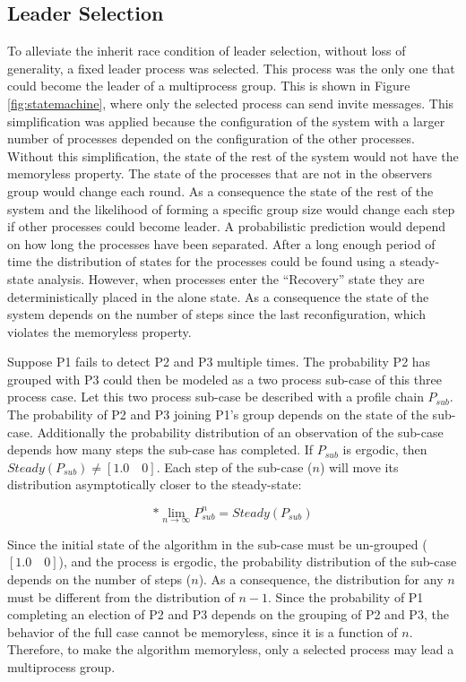 \subsection{Leader Selection}

To alleviate the inherit race condition of leader selection, without loss of generality, a fixed leader process was selected.
This process was the only one that could become the leader of a multiprocess group.
This is shown in Figure \ref{fig:statemachine}, where only the selected process can send invite messages.
This simplification was applied because the configuration of the system with a larger number of processes depended on the configuration of the other processes.
Without this simplification, the state of the rest of the system would not have the memoryless property.
The state of the processes that are not in the observers group would change each round.
As a consequence the state of the rest of the system and the likelihood of forming a specific group size would change each step if other processes could become leader.
A probabilistic prediction would depend on how long the processes have been separated.
After a long enough period of time the distribution of states for the processes could be found using a steady-state analysis.
However, when processes enter the ``Recovery'' state they are deterministically placed in the alone state.
As a consequence the state of the system depends on the number of steps since the last reconfiguration, which violates the memoryless property.

Suppose P1 fails to detect P2 and P3 multiple times.
The probability P2 has grouped with P3 could then be modeled as a two process sub-case of this three process case.
Let this two process sub-case be described with a profile chain $P_{sub}$.
The probability of P2 and P3 joining P1's group depends on the state of the sub-case.
Additionally the probability distribution of an observation of the sub-case depends how many steps the sub-case has completed.
If $P_{sub}$ is ergodic, then $Steady(P_{sub}{}) \neq [1.0 \quad 0]$.
Each step of the sub-case ($n$) will move its distribution asymptotically closer to the steady-state:

\begin{equation} [1.0 \quad 0] * \lim_{n \to \infty}P_{sub}^n = Steady(P_{sub}) \end{equation}

Since the initial state of the algorithm in the sub-case must be un-grouped ($[1.0 \quad 0]$), and the process is ergodic, the probability distribution of the sub-case depends on the number of steps ($n$).
As a consequence, the distribution for any $n$ must be different from the distribution of $n-1$.
Since the probability of P1 completing an election of P2 and P3 depends on the grouping of P2 and P3, the behavior of the full case cannot be memoryless, since it is a function of $n$.
Therefore, to make the algorithm memoryless, only a selected process may lead a multiprocess group.

